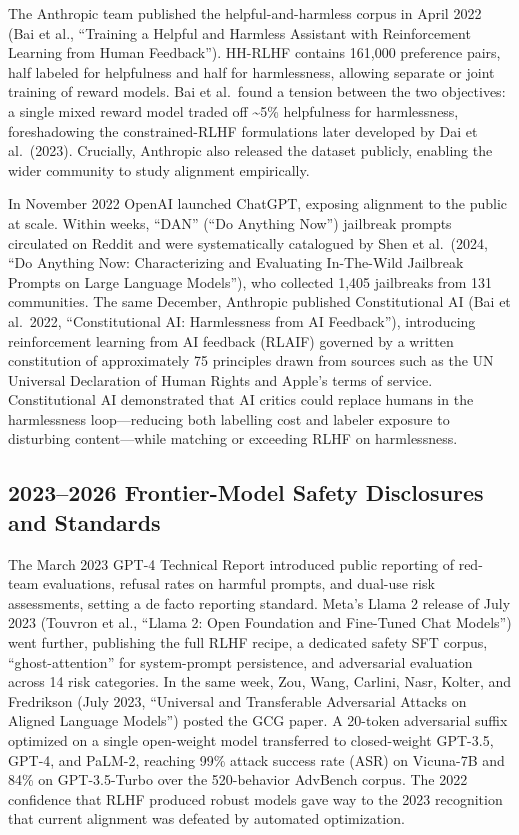 The Anthropic team published the helpful-and-harmless corpus in April 2022 (Bai et al., ``Training a Helpful and Harmless Assistant with Reinforcement Learning from Human Feedback''). HH-RLHF contains 161,000 preference pairs, half labeled for helpfulness and half for harmlessness, allowing separate or joint training of reward models. Bai et al.~found a tension between the two objectives: a single mixed reward model traded off \textasciitilde5\% helpfulness for harmlessness, foreshadowing the constrained-RLHF formulations later developed by Dai et al.~(2023). Crucially, Anthropic also released the dataset publicly, enabling the wider community to study alignment empirically.

In November 2022 OpenAI launched ChatGPT, exposing alignment to the public at scale. Within weeks, ``DAN'' (``Do Anything Now'') jailbreak prompts circulated on Reddit and were systematically catalogued by Shen et al.~(2024, ``Do Anything Now: Characterizing and Evaluating In-The-Wild Jailbreak Prompts on Large Language Models''), who collected 1,405 jailbreaks from 131 communities. The same December, Anthropic published Constitutional AI (Bai et al.~2022, ``Constitutional AI: Harmlessness from AI Feedback''), introducing reinforcement learning from AI feedback (RLAIF) governed by a written constitution of approximately 75 principles drawn from sources such as the UN Universal Declaration of Human Rights and Apple's terms of service. Constitutional AI demonstrated that AI critics could replace humans in the harmlessness loop---reducing both labelling cost and labeler exposure to disturbing content---while matching or exceeding RLHF on harmlessness.

\subsection{2023--2026 Frontier-Model Safety Disclosures and Standards}\label{frontier-model-safety-disclosures-and-standards}

The March 2023 GPT-4 Technical Report introduced public reporting of red-team evaluations, refusal rates on harmful prompts, and dual-use risk assessments, setting a de facto reporting standard. Meta's Llama 2 release of July 2023 (Touvron et al., ``Llama 2: Open Foundation and Fine-Tuned Chat Models'') went further, publishing the full RLHF recipe, a dedicated safety SFT corpus, ``ghost-attention'' for system-prompt persistence, and adversarial evaluation across 14 risk categories. In the same week, Zou, Wang, Carlini, Nasr, Kolter, and Fredrikson (July 2023, ``Universal and Transferable Adversarial Attacks on Aligned Language Models'') posted the GCG paper. A 20-token adversarial suffix optimized on a single open-weight model transferred to closed-weight GPT-3.5, GPT-4, and PaLM-2, reaching 99\% attack success rate (ASR) on Vicuna-7B and 84\% on GPT-3.5-Turbo over the 520-behavior AdvBench corpus. The 2022 confidence that RLHF produced robust models gave way to the 2023 recognition that current alignment was defeated by automated optimization.

